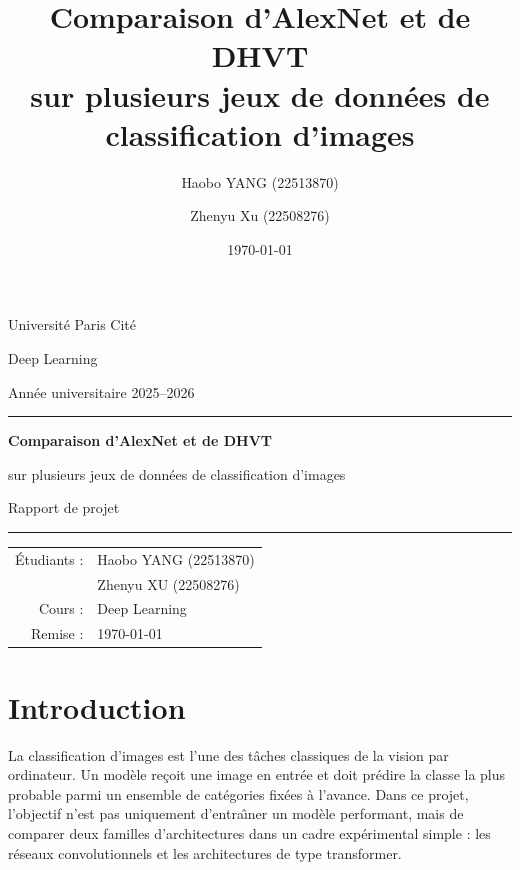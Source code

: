 \documentclass[11pt,a4paper]{article}
\title{Comparaison d'AlexNet et de DHVT\\sur plusieurs jeux de donn\'ees de classification d'images}
\author{Haobo YANG (22513870) \and Zhenyu Xu (22508276)}
\date{\today}
\begin{document}
\begin{titlepage}
    \centering
    \vspace*{1.5cm}

    {\Large Université Paris Cité\par}
    \vspace{0.3cm}
    {\large Deep Learning\par}
    \vspace{0.2cm}
    {\normalsize Année universitaire 2025--2026\par}
    \vspace{1.2cm}

    {\color{gray}\rule{0.8\linewidth}{0.8pt}\par}
    \vspace{1.2cm}

    {\huge\bfseries Comparaison d'AlexNet et de DHVT\par}
    \vspace{0.6cm}
    {\Large sur plusieurs jeux de donn\'ees de classification d'images\par}
    \vspace{0.8cm}
    {\large Rapport de projet\par}
    \vspace{1.2cm}

    {\color{gray}\rule{0.8\linewidth}{0.8pt}\par}
    \vspace{1.6cm}

    \begin{tabular}{rl}
        \'Etudiants : & Haobo YANG (22513870) \\
         & Zhenyu XU (22508276) \\
        Cours : & Deep Learning \\
        Remise : & \today \\
    \end{tabular}

    \vfill
\end{titlepage}

\tableofcontents
\newpage

\section{Introduction}
La classification d'images est l'une des t\^aches classiques de la vision par ordinateur. Un mod\`ele re\c coit une image en entr\'ee et doit pr\'edire la classe la plus probable parmi un ensemble de cat\'egories fix\'ees \`a l'avance. Dans ce projet, l'objectif n'est pas uniquement d'entra\^\i ner un mod\`ele performant, mais de comparer deux familles d'architectures dans un cadre exp\'erimental simple : les r\'eseaux convolutionnels et les architectures de type transformer.
\end{document}
